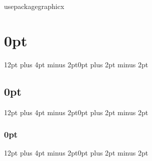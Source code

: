 usepackage{graphicx}

\usepackage{verbatim}
\usepackage{pgfplots}
\usepackage{latexsym}
\usepackage{mathchars}
\usepackage{setspace}
\usepackage{dirtree}

\usepackage{cleveref} 
\usepackage{color}               %
\usepackage{appendix}            %
\usepackage{amsmath}             %
\usepackage{mathtools}

\usepackage{enumitem}            %

\usepackage[procnames]{listings} %
\usepackage{fancyvrb} %
\usepackage{parskip}             %

\usepackage{float}              %
\usepackage[colorlinks=false, pdfborder={0 0 0}]{hyperref}
\usepackage{algorithm}
\usepackage{algpseudocode}
\newcommand{\tab}[1]{\hspace{.08\textwidth}{#1}} %
\newcommand{\LineIf}[3]{ {#1}
  \algorithmicif\ {#2}
  \algorithmicelse\ {#3} } %

\usepackage{booktabs}
\usepackage{subcaption}
\usepackage{wrapfig}
\usepackage{floatflt}

\usepackage[backref=true,
  style=numeric-comp,
  citereset=section,
  maxcitenames=3,
  maxbibnames=100]{biblatex}

\setlength\bibitemsep{1em}

\usepackage{titlesec}
\titlespacing\section{0pt}{12pt plus 4pt minus 2pt}{0pt plus 2pt minus 2pt}
\titlespacing\subsection{0pt}{12pt plus 4pt minus 2pt}{0pt plus 2pt minus 2pt}
\titlespacing\subsubsection{0pt}{12pt plus 4pt minus 2pt}{0pt plus 2pt minus 2pt}

